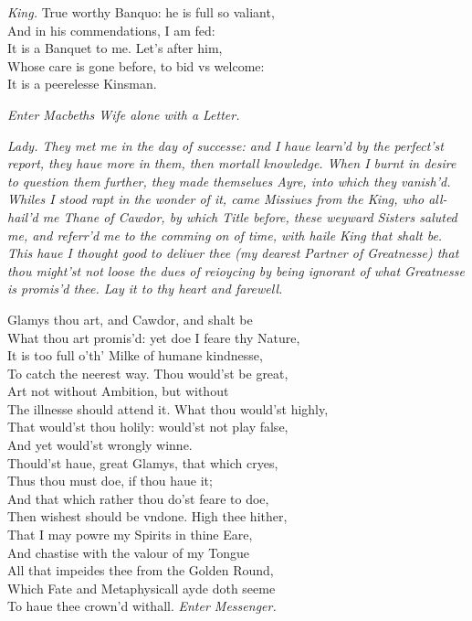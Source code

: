 \documentclass[12pt]{sides}
\newcommand{\dia}[1]{\hskip 15pt\textit{#1}\hskip 6pt}
\newcommand{\cstagedir}[1]{%
  \vspace{6pt}%
  \centerline{\textit{#1}}%
  \vspace{12pt}%
}
\begin{document}
\begin{multicols}{2}
            \dia{King.} True worthy Banquo: he is full so valiant, \\ And in his commendations, I am fed: \\ It is a Banquet to me. Let's after him, \\ Whose care is gone before, to bid vs welcome: \\ It is a peerelesse Kinsman. 
            \cstagedir{Enter Macbeths Wife alone with a Letter.}

            \dia{\textnormal{Lady.} They met me in the day of successe: and I haue learn'd by the perfect'st report, they haue more in them, then mortall knowledge. When I burnt in desire to question them further, they made themselues Ayre, into which they vanish'd. Whiles I stood rapt in the wonder of it, came Missiues from the King, who all-hail'd me Thane of Cawdor, by which Title before, these weyward Sisters saluted me, and referr'd me to the comming on of time, with haile King that shalt be. This haue I thought good to deliuer thee (my dearest Partner of Greatnesse) that thou might'st not loose the dues of reioycing by being ignorant of what Greatnesse is promis'd thee. Lay it to thy heart and farewell.}
            
            Glamys thou art, and Cawdor, and shalt be \\ What thou art promis'd: yet doe I feare thy Nature, \\ It is too full o'th' Milke of humane kindnesse, \\ To catch the neerest way. Thou would'st be great, \\ Art not without Ambition, but without \\ The illnesse should attend it. What thou would'st highly, \\ That would'st thou holily: would'st not play false, \\ And yet would'st wrongly winne. \\ Thould'st haue, great Glamys, that which cryes, \\ Thus thou must doe, if thou haue it; \\ And that which rather thou do'st feare to doe, \\ Then wishest should be vndone. High thee hither, \\ That I may powre my Spirits in thine Eare, \\ And chastise with the valour of my Tongue \\ All that impeides thee from the Golden Round, \\ Which Fate and Metaphysicall ayde doth seeme \\ To haue thee crown'd withall. \hfill \textit{Enter Messenger.}


\end{multicols}
\end{document}
